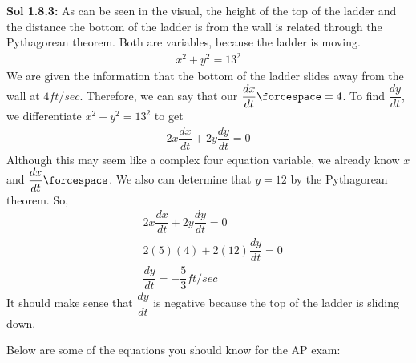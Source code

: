 \begin{tcolorbox}[solution]
    \textbf{Sol 1.8.3: } As can be seen in the visual, the height of the top of the ladder and the distance the bottom of the ladder is from the wall is related through the Pythagorean theorem. Both are variables, because the ladder is moving. \begin{align*}
        x^2 + y^2 = 13^2
    \end{align*}
    We are given the information that the bottom of the ladder slides away from the wall at $4 \si{ft \per sec}$. Therefore, we can say that our $\dfrac{dx}{dt} \forcespace = 4$. To find $\dfrac{dy}{dt}$, we differentiate $x^2 + y^2 = 13^2$ to get \begin{align*}
        2x\dfrac{dx}{dt} + 2y\dfrac{dy}{dt} = 0
    \end{align*}
    Although this may seem like a complex four equation variable, we already know $x$ and $\dfrac{dx}{dt} \forcespace$. We also can determine that $y = 12$ by the Pythagorean theorem. So, \begin{align*}
        & 2x\dfrac{dx}{dt} + 2y\dfrac{dy}{dt} = 0 \\[11pt]
        & 2(5)(4) + 2(12)\dfrac{dy}{dt} = 0 \\[11pt]
        & \dfrac{dy}{dt} = \boxed{-\dfrac{5}{3} \si{ft \per sec}}
    \end{align*}
    It should make sense that $\dfrac{dy}{dt}$ is negative because the top of the ladder is sliding down.
\end{tcolorbox}

Below are some of the equations you should know for the AP exam: \par

